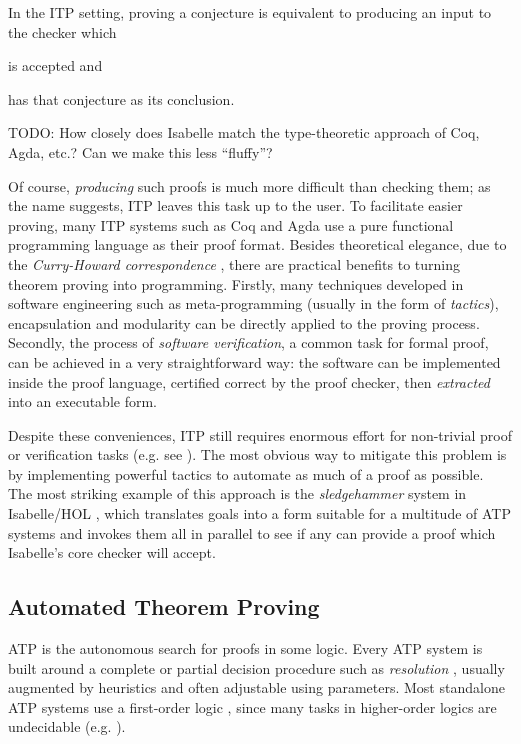 \documentclass[]{article}
\begin{document}
In the ITP setting, proving a conjecture is equivalent to producing an input to the checker which \begin{inparaenum}[a)]
  \item is accepted and
  \item has that conjecture as its conclusion.
\end{inparaenum}

TODO: How closely does Isabelle match the type-theoretic approach of Coq, Agda, etc.? Can we make this less ``fluffy''?

Of course, \emph{producing} such proofs is much more difficult than checking them; as the name suggests, ITP leaves this task up to the user. To facilitate easier proving, many ITP systems such as Coq and Agda use a pure functional programming language as their proof format. Besides theoretical elegance, due to the \emph{Curry-Howard correspondence} \cite{wadler2015propositions}, there are practical benefits to turning theorem proving into programming. Firstly, many techniques developed in software engineering such as meta-programming (usually in the form of \emph{tactics}), encapsulation and modularity can be directly applied to the proving process. Secondly, the process of \emph{software verification}, a common task for formal proof, can be achieved in a very straightforward way: the software can be implemented inside the proof language, certified correct by the proof checker, then \emph{extracted} into an executable form.

Despite these conveniences, ITP still requires enormous effort for non-trivial proof or verification tasks (e.g. see \cite{hales2015formal}). The most obvious way to mitigate this problem is by implementing powerful tactics to automate as much of a proof as possible. The most striking example of this approach is the \emph{sledgehammer} system in Isabelle/HOL \cite{journals/iandc/MengQP06}, which translates goals into a form suitable for a multitude of ATP systems and invokes them all in parallel to see if any can provide a proof which Isabelle's core checker will accept.

\subsection{Automated Theorem Proving}

ATP is the autonomous search for proofs in some logic. Every ATP system is built around a complete or partial decision procedure such as \emph{resolution} \cite[\S~9.6]{Russell:2003:AIM:773294}, usually augmented by heuristics and often adjustable using parameters. Most standalone ATP systems use a first-order logic \cite[\S~10]{Russell:2003:AIM:773294}, since many tasks in higher-order logics are undecidable (e.g. \cite{huet1973undecidability}).
\end{document}
